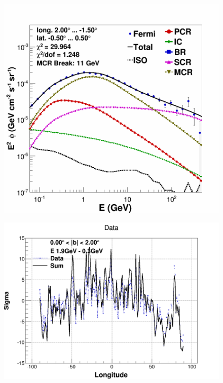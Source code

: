 \begin{figure}[h]
  \centering
  \begin{minipage}[h]{0.45\textwidth}
	  \centering
	  \includegraphics[width=\linewidth]{pic/results/MCRonly_CMZ.png}
	  \subcaption{}
  	  \label{fig:MCRonly_CMZ_1}
  \end{minipage}
  \hfill
  \begin{minipage}[h]{0.45\textwidth}
	  \centering
	  \includegraphics[width=\linewidth]{pic/results/MCRonly_weniger_sum_0-2.png}	  
  	  \subcaption{}
	  \label{fig:MCRonly_weniger}
  \end{minipage}
  

\end{figure}
